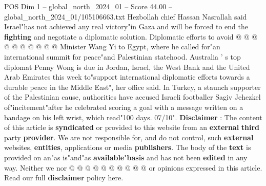 \begin{textsample}{POS Dim 1 – global\_north\_2024\_01 – Score 44.00 – global\_north\_2024\_01/105106663.txt}
Hezbollah chief Hassan Nasrallah said Israel"has not achieved any real victory"in Gaza and will be forced to end the \textbf{fighting} and negotiate a diplomatic solution.
Diplomatic efforts to avoid @ @ @ @ @ @ @ @ @ @ Minister Wang Yi to Egypt, where he called for"an international summit for peace"and Palestinian statehood.
Australia ' s top diplomat Penny Wong is due in Jordan, Israel, the West Bank and the United Arab Emirates this week to"support international diplomatic efforts towards a durable peace in the Middle East", her office said.
In Turkey, a staunch supporter of the Palestinian cause, authorities have accused Israeli footballer Sagiv Jehezkel of"incitement"after he celebrated scoring a goal with a message written on a bandage on his left wrist, which read"100 days. 07/10". \textbf{Disclaimer} : The content of this article is \textbf{syndicated} or provided to this website from an \textbf{external} \textbf{third} party \textbf{provider}.
We are not responsible for, and do not control, such \textbf{external} websites, \textbf{entities}, applications or media \textbf{publishers}.
The body of the \textbf{text} is provided on an"as is"and"as \textbf{available}"\textbf{basis} and has not been \textbf{edited} in any way.
Neither we nor @ @ @ @ @ @ @ @ @ @ or opinions expressed in this article.
Read our full \textbf{disclaimer} policy here.

\end{textsample}
